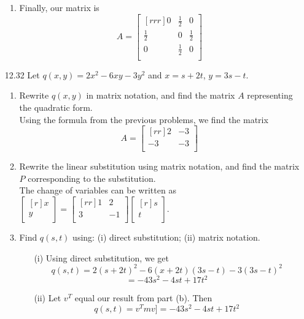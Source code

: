 \documentclass[12pt]{article}
\theoremstyle{definition}
\theoremstyle{plain}
\begin{document}
\begin{enumerate}
\begin{enumerate}
	\item Finally, our matrix is
	\[ A=\begin{bmatrix}[rrr]0&\frac{1}{2}&0\\\frac{1}{2}&0&\frac{1}{2}\\0&\frac{1}{2}&0\\\end{bmatrix} \]
	\end{enumerate}		
\item[12.32]Let $q(x,y)=2x^2-6xy-3y^2$ and $x=s+2t$, $y=3s-t$.
	\begin{enumerate}
	\item Rewrite $q(x,y)$ in matrix notation, and find the matrix $A$ representing the quadratic form.\\
	Using the formula from the previous problems, we find the matrix
	\[ A=\begin{bmatrix}[rr]2&-3\\-3&-3\\\end{bmatrix} \]
	\item Rewrite the linear substitution using matrix notation, and find the matrix $P$ corresponding to the substitution.\\
	The change of variables can be written as $\begin{bmatrix}[r]x\\y\\\end{bmatrix}=\begin{bmatrix}[rr]1&2\\3&-1\\\end{bmatrix}\begin{bmatrix}[r]s\\t\\\end{bmatrix}$.
	\item Find $q(s,t)$ using: (i) direct substitution; (ii) matrix notation.\\
		\begin{enumerate}
		\item[(i)]Using direct substitution, we get 
		\[ q(s,t)=2(s+2t)^2-6(x+2t)(3s-t)-3(3s-t)^2 \]
		\[ = -43s^2-4st+17t^2 \]
		\item[(ii)]Let $v^T$ equal our result from part (b). Then
		\[ q(s,t)=v^Tmv] = -43s^2-4st+17t^2 \]
		\end{enumerate}
	\end{enumerate}		
	
\end{enumerate}	
\end{document}
